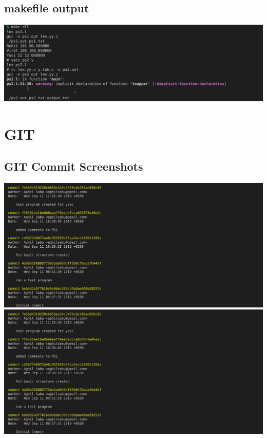 \documentclass{article}
\begin{document}
    \subsection{makefile output}
    \includegraphics[width=1.2\textwidth]{./images/mk_001.png}


    \section{GIT}
    \subsection{GIT Commit Screenshots}
    \includegraphics[width=1.2\textwidth]{./images/gt_001.png}
    \includegraphics[width=1.2\textwidth]{./images/gt_001.png}
\end{document}

